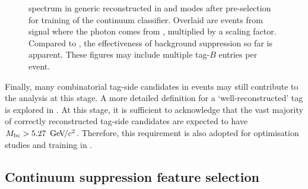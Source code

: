 \begin{figure}[htbp!]
    \centering
    \caption{\label{fig:preselected_photons} \BtoXsgamma spectrum in generic \MC reconstructed in \feiBp and \feiBz modes
    after pre-selection for training of the continuum \BDT classifier.
    Overlaid are events from signal \MC where the photon comes from \BtoXsgamma, multiplied by a scaling factor.
    Compared to , the effectiveness of background suppression so far is apparent.
    These figures may include multiple tag-$B$ entries per event.
    }
\end{figure}

Finally, many combinatorial tag-side candidates in \BB events may still contribute to the analysis at this stage.
A more detailed definition for a `well-reconstructed' tag is explored in .
At this stage, it is sufficient to acknowledge that the vast majority of correctly reconstructed tag-side candidates are expected to have \mbox{${M_{\mathrm{bc}}}>5.27~{\mathrm{\,Ge\kern -0.1em V\!/}c^2}$}.
Therefore, this requirement is also adopted for optimisation studies and training in .

\subsection{Continuum suppression feature selection}\label{sec:continuum_features}

